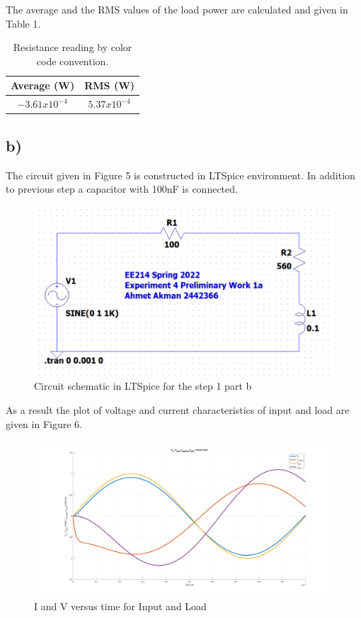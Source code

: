 \documentclass[letterpaper,12pt]{article}
\begin{document}
The average and the RMS values of the load power are calculated and given in Table 1.
\begin{table}[H]
    \begin{center}
        \caption{Resistance reading by color code convention.}
        \vspace{2mm}
        \begin{tabular}{||c | c ||} 
            \hline
            Average (W) & RMS (W) \\ [0.5ex] 
            \hline\hline
            \(-3.61x10^{-4}\) & \(5.37x10^{-4}\)  \\ 
            \hline
    \end{tabular}
\end{center}
\end{table}

\subsection{b)}
The circuit given in Figure 5 is constructed in LTSpice environment. In addition to previous step a capacitor with 100nF is connected.
\begin{figure}[H]
    \centering
    \includegraphics[width=1\textwidth]{1aSCH.png}
    \caption{Circuit schematic in LTSpice for the step 1 part b}
\end{figure} 
As a result the plot of voltage and current characteristics of input and load are given in Figure 6.
\begin{figure}[H]
    \centering
    \includegraphics[width=1\textwidth]{2_1.png}
    \caption{I and V versus time for Input and Load}
\end{figure} 
\end{document}
